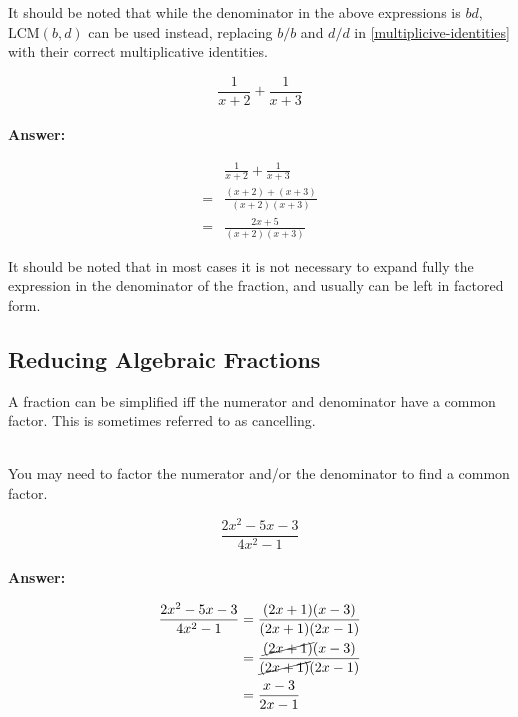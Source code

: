 \documentclass[english,course]{lecture}
\begin{document}
It should be noted that while the denominator in the above expressions is $bd$,
$\text{LCM}(b,d)$ can be used instead, replacing $b/b$ and $d/d$ in \ref{multiplicive-identities}
with their correct multiplicative identities.

\begin{example}[Simplify]
	$$
		\frac{1}{x+2} + \frac{1}{x+3}
	$$\\
	\textbf{Answer:}

	\begin{align*}
		  & \frac{1}{x+2} + \frac{1}{x+3}    \\
		= & \frac{(x+2) + (x+3)}{(x+2)(x+3)} \\
		= & \frac{2x+5}{(x+2)(x+3)}
	\end{align*}
\end{example}

It should be noted that in most cases it is not necessary to expand
fully the expression in the denominator of the fraction, and usually can be
left in factored form.

\subsection{Reducing Algebraic Fractions}

\begin{theorem}
	A fraction can be simplified iff the numerator and denominator have a common factor.
	This is sometimes referred to as cancelling.
\end{theorem}
\\
You may need to factor the numerator and/or the denominator to
find a common factor.

\begin{example}[Simplify]
	$$
		\frac{2x^2 - 5x - 3}{4x^2 - 1}
	$$
	\\
	\textbf{Answer:}

	\begin{align*}
		\frac{2x^2 - 5x - 3}{4x^2 - 1}
		  & = \frac{(2x + 1)(x-3)}{(2x + 1)(2x - 1)}                   \\
		  & = \frac{\cancel{(2x + 1)}(x-3)}{\cancel{(2x + 1)}(2x - 1)} \\
		  & = \frac{x - 3}{2x - 1}
	\end{align*}
\end{example}
\end{document}
